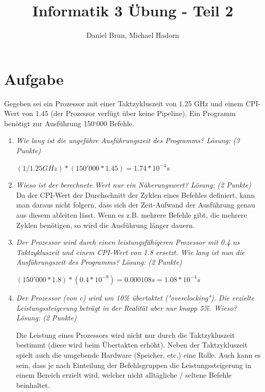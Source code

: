 \documentclass[10pt]{article}
\title{Informatik 3 Übung - Teil 2\vspace{-2ex}}
\author{Daniel Brun, Michael Hadorn\vspace{-2ex}}
\begin{document}
\maketitle

\section{Aufgabe}
Gegeben sei ein Prozessor mit einer Taktzykluszeit von 1.25 GHz und einem CPI-Wert von 1.45 (der Prozessor verfügt über keine Pipeline). Ein Programm benötigt zur Ausführung 150‘000 Befehle.

\begin{enumerate}[label=\alph*)]
	\item 
	\textit{Wie lang ist die ungefähre Ausführungszeit des	Programms? Lösung: (3 Punkte)}
	
	$ (1 / 1.25 GHz)*(150'000 * 1.45) = 1.74 * 10^{-4} s$
	
	\item
	\textit{Wieso ist der berechnete Wert nur ein Näherungswert? Lösung: (2 Punkte)}\\
	Da der CPI-Wert der Durchschnitt der Zyklen eines Befehles definiert, kann man daraus nicht folgern, dass sich der Zeit-Aufwand der Ausführung genau aus diesem ableiten lässt. Wenn es z.B. mehrere Befehle gibt, die mehrere Zyklen benötigen, so wird die Ausführung länger dauern.
	\item
	\textit{Der Prozessor wird durch einen leistungsfähigeren Prozessor mit 0.4 ns Taktzykluszeit und einem CPI-Wert von 1.8 ersetzt. Wie lang ist nun die Ausführungszeit des Programms? Lösung: (2 Punkte)}
	
	$ (150'000*1.8)*(0.4*10^{-9}) = 0.000108 s = 1.08 * 10^{-4} s$\\
			
	\item
	\textit{Der Prozessor (von c) wird um 10\% übertaktet ("overclocking"). Die erzielte Leistungssteigerung beträgt in der Realität aber nur knapp 5\%. Wieso? Lösung: (2 Punkte)}
	
	Die Leistung eines Prozessors wird nicht nur durch die Taktzykluszeit bestimmt (diese wird beim Übertakten erhöht). Neben der Taktzykluszeit spielt auch die umgebende Hardware (Speicher, etc.) eine Rolle. Auch kann es sein, dass je nach Einteilung der Befehlsgruppen die Leistungssteigerung in einem Bereich erzielt wird, welcher nicht alltägliche / seltene Befehle beinhaltet.
	
\end{enumerate}
\newpage
\end{document}

